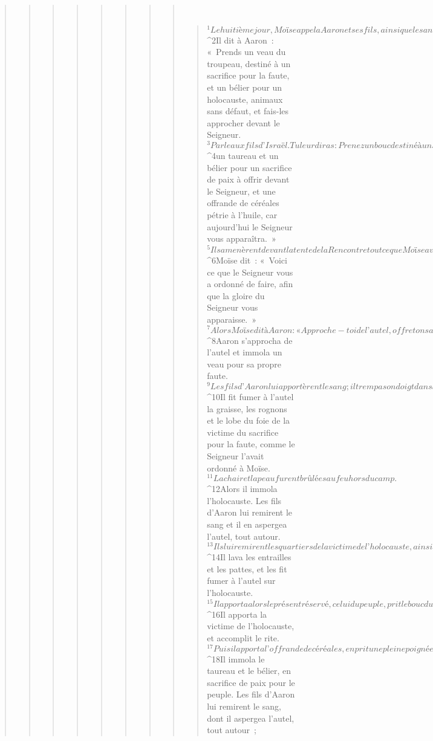 \begin{verse}
\begin{verse}
\begin{verse}
\begin{verse}
\begin{verse}
\begin{verse}
\begin{verse}
\begin{verse}
         
      \bchapter{}
      \begin{verse}
${}^{1}Le huitième jour, Moïse appela Aaron et ses fils, ainsi que les anciens d’Israël. 
${}^{2}Il dit à Aaron : « Prends un veau du troupeau, destiné à un sacrifice pour la faute, et un bélier pour un holocauste, animaux sans défaut, et fais-les approcher devant le Seigneur. 
${}^{3}Parle aux fils d’Israël. Tu leur diras : Prenez un bouc destiné à un sacrifice pour la faute, un veau et un agneau, de l’année et sans défaut, pour un holocauste, 
${}^{4}un taureau et un bélier pour un sacrifice de paix à offrir devant le Seigneur, et une offrande de céréales pétrie à l’huile, car aujourd’hui le Seigneur vous apparaîtra. »
${}^{5}Ils amenèrent devant la tente de la Rencontre tout ce que Moïse avait ordonné d’amener, puis toute la communauté s’approcha et se tint debout devant le Seigneur. 
${}^{6}Moïse dit : « Voici ce que le Seigneur vous a ordonné de faire, afin que la gloire du Seigneur vous apparaisse. » 
${}^{7}Alors Moïse dit à Aaron : « Approche-toi de l’autel, offre ton sacrifice pour la faute et ton holocauste, accomplis le rite d’expiation pour toi et pour le peuple, puis offre le présent réservé du peuple, et accomplis le rite d’expiation pour lui, comme le Seigneur l’a ordonné. »
${}^{8}Aaron s’approcha de l’autel et immola un veau pour sa propre faute. 
${}^{9}Les fils d’Aaron lui apportèrent le sang ; il trempa son doigt dans le sang et en mit sur les cornes de l’autel ; il versa le reste du sang à la base de l’autel. 
${}^{10}Il fit fumer à l’autel la graisse, les rognons et le lobe du foie de la victime du sacrifice pour la faute, comme le Seigneur l’avait ordonné à Moïse. 
${}^{11}La chair et la peau furent brûlées au feu hors du camp.
${}^{12}Alors il immola l’holocauste. Les fils d’Aaron lui remirent le sang et il en aspergea l’autel, tout autour. 
${}^{13}Ils lui remirent les quartiers de la victime de l’holocauste, ainsi que la tête, et il les fit fumer sur l’autel. 
${}^{14}Il lava les entrailles et les pattes, et les fit fumer à l’autel sur l’holocauste.
${}^{15}Il apporta alors le présent réservé, celui du peuple, prit le bouc du sacrifice pour la faute du peuple, l’immola et le sacrifia pour la faute comme précédemment. 
${}^{16}Il apporta la victime de l’holocauste, et accomplit le rite. 
${}^{17}Puis il apporta l’offrande de céréales, en prit une pleine poignée, et la fit fumer sur l’autel, en plus de l’holocauste du matin.
${}^{18}Il immola le taureau et le bélier, en sacrifice de paix pour le peuple. Les fils d’Aaron lui remirent le sang, dont il aspergea l’autel, tout autour ; 

\end{verse}
\end{verse}
\end{verse}
\end{verse}
\end{verse}
\end{verse}
\end{verse}
\end{verse}
\end{verse}
